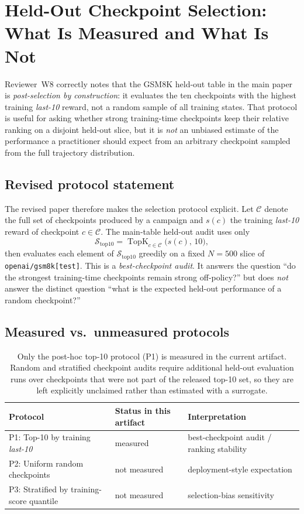 \section{Held-Out Checkpoint Selection: What Is Measured and What Is Not}
\label{sec:heldout-stratified}

Reviewer~W8 correctly notes that the GSM8K held-out table in the main paper
is \emph{post-selection by construction}: it evaluates the ten checkpoints
with the highest training \emph{last-10} reward, not a random sample of all
training states. That protocol is useful for asking whether strong
training-time checkpoints keep their relative ranking on a disjoint held-out
slice, but it is \emph{not} an unbiased estimate of the performance a
practitioner should expect from an arbitrary checkpoint sampled from the full
trajectory distribution.

\subsection{Revised protocol statement}

The revised paper therefore makes the selection protocol explicit. Let
$\mathcal{C}$ denote the full set of checkpoints produced by a campaign and
$s(c)$ the training \emph{last-10} reward of checkpoint $c \in \mathcal{C}$.
The main-table held-out audit uses only
\[
\mathcal{S}_{\text{top10}} = \operatorname{TopK}_{c \in \mathcal{C}}\bigl(s(c),\,10\bigr),
\]
then evaluates each element of $\mathcal{S}_{\text{top10}}$ greedily on a
fixed $N=500$ slice of \texttt{openai/gsm8k[test]}. This is a
\emph{best-checkpoint audit}. It answers the question
``do the strongest training-time checkpoints remain strong off-policy?''
but does \emph{not} answer the distinct question
``what is the expected held-out performance of a random checkpoint?''

\subsection{Measured vs.\ unmeasured protocols}

\begin{table}[ht]
\centering
\small
\begin{tabular}{@{}lll@{}}
\toprule
\textbf{Protocol} & \textbf{Status in this artifact} & \textbf{Interpretation} \\
\midrule
P1: Top-10 by training \emph{last-10} & measured &
best-checkpoint audit / ranking stability \\
P2: Uniform random checkpoints & not measured &
deployment-style expectation \\
P3: Stratified by training-score quantile & not measured &
selection-bias sensitivity \\
\bottomrule
\end{tabular}
\caption{Only the post-hoc top-10 protocol (P1) is measured in the current
artifact. Random and stratified checkpoint audits require additional held-out
evaluation runs over checkpoints that were not part of the released top-10
set, so they are left explicitly unclaimed rather than estimated with a
surrogate.}
\label{tab:heldout-stratified}
\end{table}

